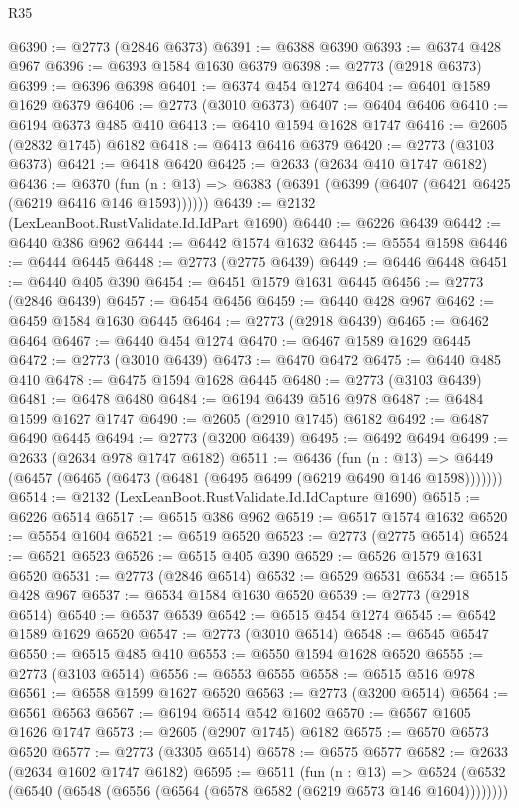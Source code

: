 \begin{lexlean}{R35}
\begin{coremodule}
@6390 := @2773 (@2846 @6373)
@6391 := @6388 @6390
@6393 := @6374 @428 @967
@6396 := @6393 @1584 @1630 @6379
@6398 := @2773 (@2918 @6373)
@6399 := @6396 @6398
@6401 := @6374 @454 @1274
@6404 := @6401 @1589 @1629 @6379
@6406 := @2773 (@3010 @6373)
@6407 := @6404 @6406
@6410 := @6194 @6373 @485 @410
@6413 := @6410 @1594 @1628 @1747
@6416 := @2605 (@2832 @1745) @6182
@6418 := @6413 @6416 @6379
@6420 := @2773 (@3103 @6373)
@6421 := @6418 @6420
@6425 := @2633 (@2634 @410 @1747 @6182)
@6436 := @6370
    (fun (n : @13) => @6383 (@6391 (@6399 (@6407 (@6421 @6425 (@6219 @6416 @146 @1593))))))
@6439 := @2132 (LexLeanBoot.RustValidate.Id.IdPart @1690)
@6440 := @6226 @6439
@6442 := @6440 @386 @962
@6444 := @6442 @1574 @1632
@6445 := @5554 @1598
@6446 := @6444 @6445
@6448 := @2773 (@2775 @6439)
@6449 := @6446 @6448
@6451 := @6440 @405 @390
@6454 := @6451 @1579 @1631 @6445
@6456 := @2773 (@2846 @6439)
@6457 := @6454 @6456
@6459 := @6440 @428 @967
@6462 := @6459 @1584 @1630 @6445
@6464 := @2773 (@2918 @6439)
@6465 := @6462 @6464
@6467 := @6440 @454 @1274
@6470 := @6467 @1589 @1629 @6445
@6472 := @2773 (@3010 @6439)
@6473 := @6470 @6472
@6475 := @6440 @485 @410
@6478 := @6475 @1594 @1628 @6445
@6480 := @2773 (@3103 @6439)
@6481 := @6478 @6480
@6484 := @6194 @6439 @516 @978
@6487 := @6484 @1599 @1627 @1747
@6490 := @2605 (@2910 @1745) @6182
@6492 := @6487 @6490 @6445
@6494 := @2773 (@3200 @6439)
@6495 := @6492 @6494
@6499 := @2633 (@2634 @978 @1747 @6182)
@6511 := @6436
    (fun (n : @13) => @6449 (@6457 (@6465 (@6473 (@6481 (@6495 @6499 (@6219 @6490 @146 @1598)))))))
@6514 := @2132 (LexLeanBoot.RustValidate.Id.IdCapture @1690)
@6515 := @6226 @6514
@6517 := @6515 @386 @962
@6519 := @6517 @1574 @1632
@6520 := @5554 @1604
@6521 := @6519 @6520
@6523 := @2773 (@2775 @6514)
@6524 := @6521 @6523
@6526 := @6515 @405 @390
@6529 := @6526 @1579 @1631 @6520
@6531 := @2773 (@2846 @6514)
@6532 := @6529 @6531
@6534 := @6515 @428 @967
@6537 := @6534 @1584 @1630 @6520
@6539 := @2773 (@2918 @6514)
@6540 := @6537 @6539
@6542 := @6515 @454 @1274
@6545 := @6542 @1589 @1629 @6520
@6547 := @2773 (@3010 @6514)
@6548 := @6545 @6547
@6550 := @6515 @485 @410
@6553 := @6550 @1594 @1628 @6520
@6555 := @2773 (@3103 @6514)
@6556 := @6553 @6555
@6558 := @6515 @516 @978
@6561 := @6558 @1599 @1627 @6520
@6563 := @2773 (@3200 @6514)
@6564 := @6561 @6563
@6567 := @6194 @6514 @542 @1602
@6570 := @6567 @1605 @1626 @1747
@6573 := @2605 (@2907 @1745) @6182
@6575 := @6570 @6573 @6520
@6577 := @2773 (@3305 @6514)
@6578 := @6575 @6577
@6582 := @2633 (@2634 @1602 @1747 @6182)
@6595 := @6511
    (fun (n : @13) =>
    @6524 (@6532 (@6540 (@6548 (@6556 (@6564 (@6578 @6582 (@6219 @6573 @146 @1604))))))))

\end{coremodule}
\end{lexlean}
